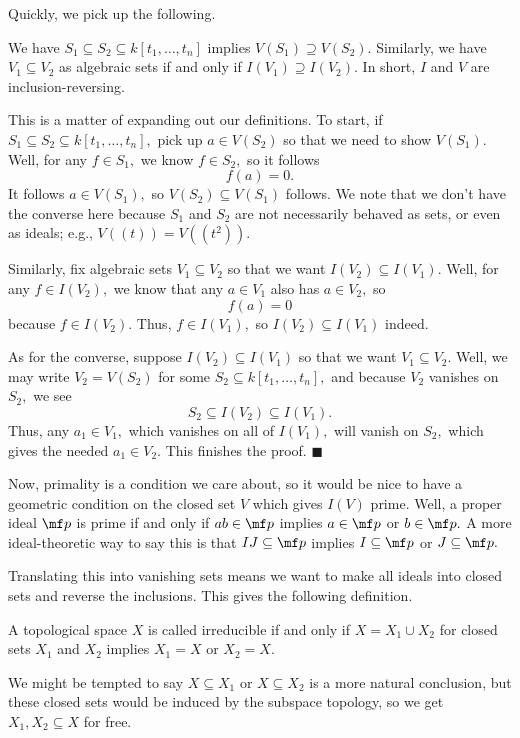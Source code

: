 Quickly, we pick up the following.
\begin{lemma}
    We have $S_1\subseteq S_2\subseteq k[t_1,\ldots,t_n]$ implies $V(S_1)\supseteq V(S_2).$ Similarly, we have $V_1\subseteq V_2$ as algebraic sets if and only if $I(V_1)\supseteq I(V_2).$ In short, $I$ and $V$ are inclusion-reversing.
\end{lemma}
This is a matter of expanding out our definitions. To start, if $S_1\subseteq S_2\subseteq k[t_1,\ldots,t_n],$ pick up $a\in V(S_2)$ so that we need to show $V(S_1).$ Well, for any $f\in S_1,$ we know $f\in S_2,$ so it follows
\[f(a)=0.\]
It follows $a\in V(S_1),$ so $V(S_2)\subseteq V(S_1)$ follows. We note that we don't have the converse here because $S_1$ and $S_2$ are not necessarily behaved as sets, or even as ideals; e.g., $V((t))=V\left(\left(t^2\right)\right)$.

Similarly, fix algebraic sets $V_1\subseteq V_2$ so that we want $I(V_2)\subseteq I(V_1).$ Well, for any $f\in I(V_2),$ we know that any $a\in V_1$ also has $a\in V_2,$ so
\[f(a)=0\]
because $f\in I(V_2).$ Thus, $f\in I(V_1),$ so $I(V_2)\subseteq I(V_1)$ indeed.

As for the converse, suppose $I(V_2)\subseteq I(V_1)$ so that we want $V_1\subseteq V_2.$ Well, we may write $V_2=V(S_2)$ for some $S_2\subseteq k[t_1,\ldots,t_n],$ and because $V_2$ vanishes on $S_2,$ we see
\[S_2\subseteq I(V_2)\subseteq I(V_1).\]
Thus, any $a_1\in V_1,$ which vanishes on all of $I(V_1),$ will vanish on $S_2,$ which gives the needed $a_1\in V_2.$ This finishes the proof.
$\blacksquare$

Now, primality is a condition we care about, so it would be nice to have a geometric condition on the closed set $V$ which gives $I(V)$ prime. Well, a proper ideal $\mf p$ is prime if and only if $ab\in\mf p$ implies $a\in\mf p$ or $b\in\mf p.$ A more ideal-theoretic way to say this is that $IJ\subseteq\mf p$ implies $I\subseteq\mf p$ or $J\subseteq\mf p.$

Translating this into vanishing sets means we want to make all ideals into closed sets and reverse the inclusions. This gives the following definition.
\begin{definition}
    A topological space $X$ is called irreducible if and only if $X=X_1\cup X_2$ for closed sets $X_1$ and $X_2$ implies $X_1=X$ or $X_2=X.$
\end{definition}
We might be tempted to say $X\subseteq X_1$ or $X\subseteq X_2$ is a more natural conclusion, but these closed sets would be induced by the subspace topology, so we get $X_1,X_2\subseteq X$ for free.

